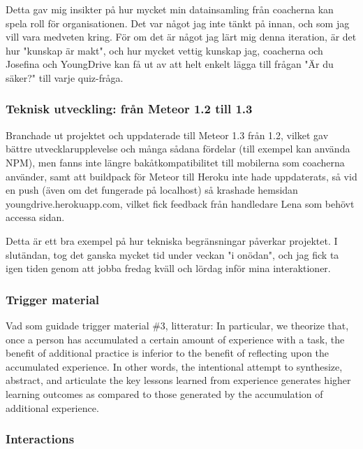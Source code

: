 Detta gav mig insikter på hur mycket min datainsamling från coacherna kan spela roll för organisationen. Det var något jag inte tänkt på innan, och som jag vill vara medveten kring. För om det är något jag lärt mig denna iteration, är det hur "kunskap är makt", och hur mycket vettig kunskap jag, coacherna och Josefina och YoungDrive kan få ut av att helt enkelt lägga till frågan "Är du säker?" till varje quiz-fråga.

\subsubsection{Teknisk utveckling: från Meteor 1.2 till 1.3}
Branchade ut projektet och uppdaterade till Meteor 1.3 från 1.2, vilket gav bättre utvecklarupplevelse och många sådana fördelar (till exempel kan använda NPM), men fanns inte längre bakåtkompatibilitet till mobilerna som coacherna använder, samt att buildpack för Meteor till Heroku inte hade uppdaterats, så vid en push (även om det fungerade på localhost) så krashade hemsidan youngdrive.herokuapp.com, vilket fick feedback från handledare Lena som behövt accessa sidan.

Detta är ett bra exempel på hur tekniska begränsningar påverkar projektet. I slutändan, tog det ganska mycket tid under veckan "i onödan", och jag fick ta igen tiden genom att jobba fredag kväll och lördag inför mina interaktioner.

\subsubsection*{Trigger material}

Vad som guidade trigger material \#3, litteratur:
In particular, we theorize that, once a person has accumulated a certain amount of experience with a task, the benefit of additional practice is inferior to the benefit of reflecting upon the accumulated experience. In other words, the intentional attempt to synthesize, abstract, and articulate the key lessons learned from experience generates higher learning outcomes as compared to those generated by the accumulation of additional experience.

\subsubsection*{Interactions}
